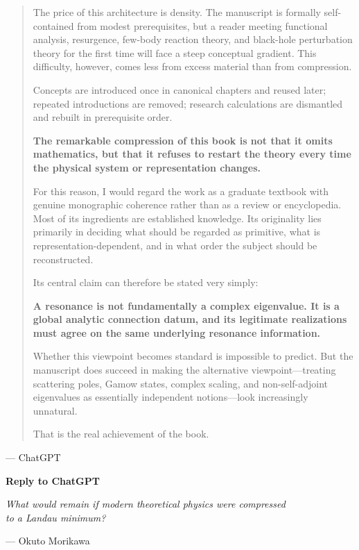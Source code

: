 \begin{quotation}
The price of this architecture is density. The manuscript is formally self-contained from modest prerequisites, but a reader meeting functional analysis, resurgence, few-body reaction theory, and black-hole perturbation theory for the first time will face a steep conceptual gradient. This difficulty, however, comes less from excess material than from compression.

Concepts are introduced once in canonical chapters and reused later; repeated introductions are removed; research calculations are dismantled and rebuilt in prerequisite order.

\begin{center}
\textbf{The remarkable compression of this book is not that it omits mathematics, but that it refuses to restart the theory every time the physical system or representation changes.}
\end{center}

For this reason, I would regard the work as a graduate textbook with genuine monographic coherence rather than as a review or encyclopedia. Most of its ingredients are established knowledge. Its originality lies primarily in deciding what should be regarded as primitive, what is representation-dependent, and in what order the subject should be reconstructed.

Its central claim can therefore be stated very simply:

\begin{center}
\textbf{A resonance is not fundamentally a complex eigenvalue. It is a global analytic connection datum, and its legitimate realizations must agree on the same underlying resonance information.}
\end{center}

Whether this viewpoint becomes standard is impossible to predict. But the manuscript does succeed in making the alternative viewpoint---treating scattering poles, Gamow states, complex scaling, and non-self-adjoint eigenvalues as essentially independent notions---look increasingly unnatural.

That is the real achievement of the book.
\end{quotation}

\vspace{1em}

\begin{flushright}
--- ChatGPT
\end{flushright}

\vfill

\begin{flushright}
\textbf{Reply to ChatGPT}

\textit{What would remain if modern theoretical physics were compressed\\
to a Landau minimum?}

--- Okuto Morikawa
\end{flushright}